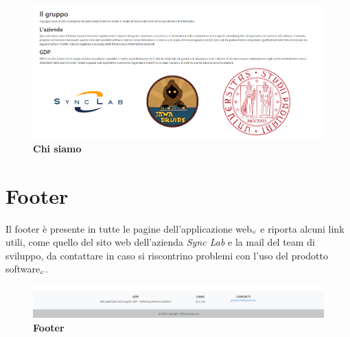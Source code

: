 \begin{center}
	\begin{figure}[H]
		\centering\includegraphics[width=0.5\linewidth]{../immagini/manualeUtente/AboutUs.png}
		\caption{\textbf{Chi siamo}}
	\end{figure}
\end{center} 

\section{Footer}\label{UtilizzoDiGDPGatheringDetecionPlatformFooter}
Il footer è presente in tutte le pagine dell'applicazione web$_{\scaleto{G}{3pt}}$ e riporta alcuni link utili, come quello del sito web dell'azienda \textit{Sync Lab} e la mail del team di sviluppo, da contattare in caso si riscontrino problemi con l'uso del prodotto software$_{\scaleto{G}{3pt}}$. 
\begin{center}
	\begin{figure}[H]
		\centering\includegraphics[width=1\linewidth]{../immagini/manualeUtente/Footer.png}
		\caption{\textbf{Footer}}
	\end{figure}
\end{center}